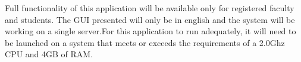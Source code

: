 
\label{sec:constraints}

Full functionality of this application will be available only for registered faculty and students. The GUI presented will only be in english and the system will be working on a single server.For this application to run adequately, it will need to be launched on a system that meets or exceeds the requirements of a 2.0Ghz CPU and 4GB of RAM.


